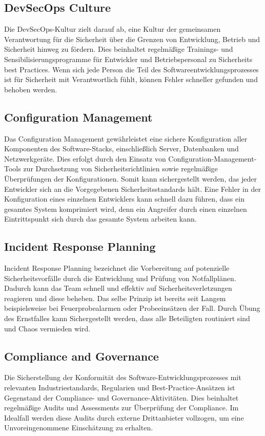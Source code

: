 \subsection{DevSecOps Culture}
Die DevSecOps-Kultur zielt darauf ab, eine Kultur der gemeinsamen Verantwortung für die Sicherheit über die Grenzen von Entwicklung, Betrieb und Sicherheit hinweg zu fördern. Dies beinhaltet regelmäßige Trainings- und Sensibilisierungsprogramme für Entwickler und Betriebspersonal zu Sicherheits best Practices. Wenn sich jede Person die Teil des Softwareentwicklungsprozesses ist für Sicherheit mit Verantwortlich fühlt, können Fehler schneller gefunden und behoben werden.

\subsection{Configuration Management}
Das Configuration Management gewährleistet eine sichere Konfiguration aller Komponenten des Software-Stacks, einschließlich Server, Datenbanken und Netzwerkgeräte. Dies erfolgt durch den Einsatz von Configuration-Management-Tools zur Durchsetzung von Sicherheitsrichtlinien sowie regelmäßige Überprüfungen der Konfigurationen. Somit kann sichergestellt werden, das jeder Entwickler sich an die Vorgegebenen Sicherheitsstandards hält. Eine Fehler in der Konfiguration eines einzelnen Entwicklers kann schnell dazu führen, dass ein gesamtes System komprimiert wird, denn ein Angreifer durch einen einzelnen Eintrittspunkt sich durch das gesamte System arbeiten kann.

\subsection{Incident Response Planning}
Incident Response Planning bezeichnet die Vorbereitung auf potenzielle Sicherheitsvorfälle durch die Entwicklung und Prüfung von Notfallplänen. Dadurch kann das Team schnell und effektiv auf Sicherheitsverletzungen reagieren und diese beheben. Das selbe Prinzip ist bereits seit Langem beispielsweise bei Feuerprobealarmen oder Probeeinsätzen der Fall. Durch Übung des Ernstfalles kann Sichergestellt werden, dass alle Beteiligten routiniert sind und Chaos vermieden wird.


\subsection{Compliance and Governance}	
Die Sicherstellung der Konformität des Software-Entwicklungsprozesses mit relevanten Industriestandards, Regularien und Best-Practice-Ansätzen ist Gegenstand der Compliance- und Governance-Aktivitäten. Dies beinhaltet regelmäßige Audits und Assessments zur Überprüfung der Compliance. Im Idealfall werden diese Audits durch externe Drittanbieter vollzogen, um eine Unvoreingenommene Einschätzung zu erhalten.

